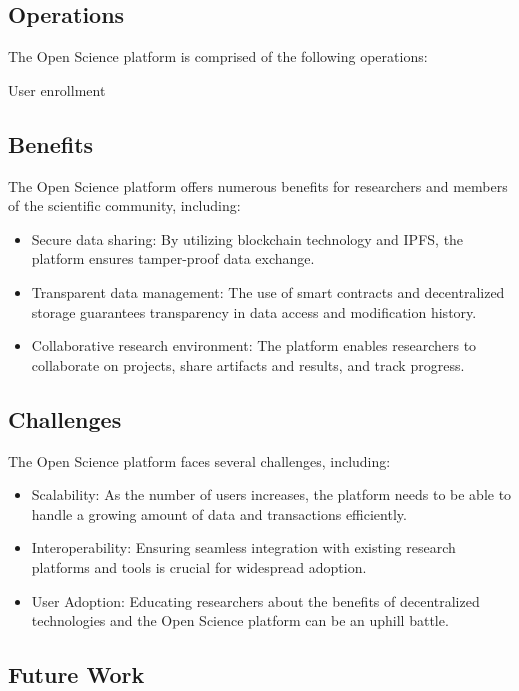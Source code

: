 \documentclass{article}
\begin{document}
\subsection{Operations}

The Open Science platform is comprised of the following operations:

User enrollment



\subsection{Benefits}

The Open Science platform offers numerous benefits for researchers and members of the scientific community, including:

\begin{itemize}
    \item Secure data sharing: By utilizing blockchain technology and IPFS, the platform ensures tamper-proof data exchange.
    \item Transparent data management: The use of smart contracts and decentralized storage guarantees transparency in data access and modification history.
    \item Collaborative research environment: The platform enables researchers to collaborate on projects, share artifacts and results, and track progress.
\end{itemize}

\subsection{Challenges}

The Open Science platform faces several challenges, including:

\begin{itemize}
    \item Scalability: As the number of users increases, the platform needs to be able to handle a growing amount of data and transactions efficiently.
    \item Interoperability: Ensuring seamless integration with existing research platforms and tools is crucial for widespread adoption.
    \item User Adoption: Educating researchers about the benefits of decentralized technologies and the Open Science platform can be an uphill battle.
\end{itemize}

\subsection{Future Work}
\end{document}

